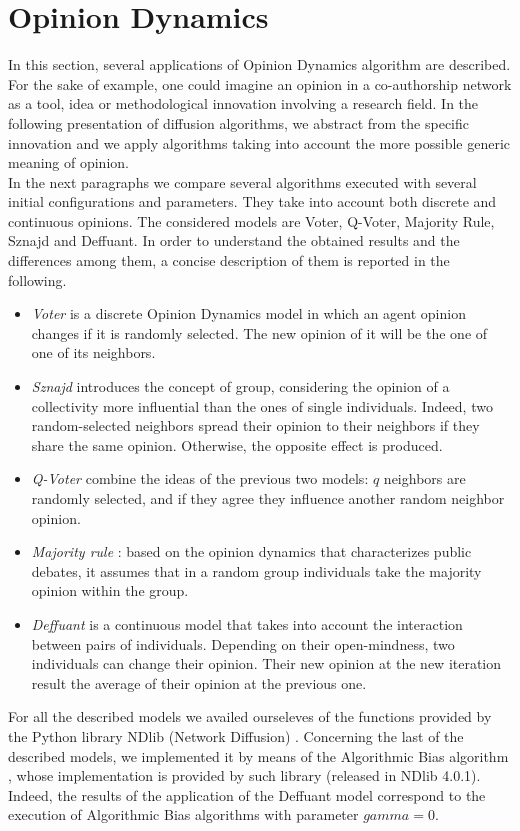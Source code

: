 \documentclass[sigchi]{acmart}
\begin{document}
\section{Opinion Dynamics} \label{sec:ODynamics}
In this section, several applications of Opinion Dynamics algorithm are described. For the sake of example, one could imagine an opinion in a co-authorship network as a tool, idea or methodological innovation involving a research field. In the following presentation of diffusion algorithms, we abstract from the specific innovation and we apply algorithms taking into account the more possible generic meaning of opinion. \\
In the next paragraphs we compare several algorithms executed with several initial configurations and parameters. They take into account both discrete and continuous opinions. The considered models are Voter, Q-Voter, Majority Rule, Sznajd and Deffuant. In order to understand the obtained results and the differences among them, a concise description of them is reported in the following. 
\begin{itemize}
    \item \textit{Voter} \cite{voter} is a discrete Opinion Dynamics model in which an agent opinion changes if it is randomly selected. The new opinion of it will be the one of one of its neighbors.
    \item \textit{Sznajd} \cite{SznajdWeron2000OpinionEI} introduces the concept of group, considering the opinion of a collectivity more influential than the ones of single individuals. Indeed, two random-selected neighbors spread their opinion to their neighbors if they share the same opinion. Otherwise, the opposite effect is produced.
    \item \textit{Q-Voter} \cite{qvoter} combine the ideas of the previous two models: $q$ neighbors are randomly selected, and if they agree they influence another random neighbor opinion.
    \item \textit{Majority rule} \cite{majority}: based on the opinion dynamics that characterizes public debates, it assumes that in a random group individuals take the majority opinion within the group.
    \item \textit{Deffuant} \cite{deffuant} is a continuous model that takes into account the interaction between pairs of individuals. Depending on their open-mindness, two individuals can change their opinion. Their new opinion at the new iteration result the average of their opinion at the previous one.
\end{itemize}
For all the described models we availed ourseleves of the functions provided by the Python library NDlib (Network Diffusion) \cite{ndlib}. Concerning the last of the described models, we implemented it by means of the Algorithmic Bias algorithm \cite{AlgorithmicBias}, whose implementation is provided by such library (released in NDlib 4.0.1). Indeed, the results of the application of the Deffuant model correspond to the execution of Algorithmic Bias algorithms with parameter $gamma = 0$.
\end{document}
